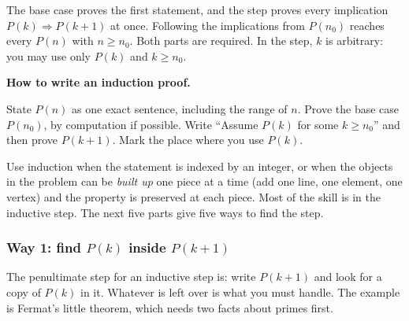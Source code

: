 \documentclass[10pt]{scrartcl}
\newcommand{\PacketInkPath}[2][]{\InkStroke[#1]{#2}}
\begin{document}
The base case proves the first statement, and the step proves every implication $P(k) \Rightarrow P(k+1)$ at once. Following the implications from $P(n_0)$ reaches every $P(n)$ with $n \geq n_0$. Both parts are required. In the step, $k$ is arbitrary: you may use only $P(k)$ and $k \geq n_0$.

\begin{fig}
\end{fig}

\noindent\textbf{How to write an induction proof.}
\begin{enumerate}
  \ii State $P(n)$ as one exact sentence, including the range of $n$.
  \ii Prove the base case $P(n_0)$, by computation if possible.
  \ii Write ``Assume $P(k)$ for some $k \ge n_0$'' and then prove $P(k+1)$. Mark the place where you use $P(k)$.
\end{enumerate}

Use induction when the statement is indexed by an integer, or when the objects in the problem can be \emph{built up} one piece at a time (add one line, one element, one vertex) and the property is preserved at each piece. Most of the skill is in the inductive step. The next five parts give five ways to find the step.

\subsubsection*{Way 1: find $P(k)$ inside $P(k+1)$}
The penultimate step for an inductive step is: write $P(k+1)$ and look for a copy of $P(k)$ in it. Whatever is left over is what you must handle. The example is Fermat's little theorem, which needs two facts about primes first.
\end{document}

